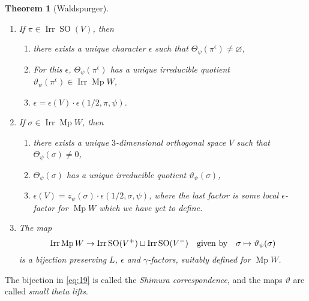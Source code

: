 \documentclass[11pt,a4paper,leqno]{article}
\newcommand{\1}{\mathbbm{1}}
\renewcommand{\emptyset}{\varnothing}
\DeclareMathOperator{\Irr}{Irr}
\DeclareMathOperator{\Mp}{Mp}
\DeclareMathOperator{\SO}{SO}
\theoremstyle{plain}
\newtheorem{theorem}{Theorem}[section]
\theoremstyle{definition}
\theoremstyle{remark}
\numberwithin{equation}{section}
\begin{document}
\begin{theorem}[Waldspurger]\mbox{\ }
  \begin{enumerate}
  \item If $\pi \in \Irr \SO(V)$, then
    \begin{enumerate}
    \item there exists a unique character $\epsilon$ such that $\Theta_{\psi}(\pi^{\epsilon})
      \ne \emptyset$,
    \item For this $\epsilon$, $\Theta_{\psi}(\pi^{\epsilon})$ has a unique irreducible
      quotient $\vartheta_{\psi}(\pi^{\epsilon}) \in \Irr \Mp W$,
    \item $\epsilon = \epsilon(V) \cdot \epsilon(1/2,\pi,\psi)$.
    \end{enumerate}
  \item If $\sigma \in \Irr \Mp W$, then 
    \begin{enumerate}
    \item there exists a unique $3$-dimensional orthogonal space $V$
      such that $\Theta_{\psi}(\sigma) \ne 0$, 
    \item $\Theta_{\psi}(\sigma)$ has a unique irreducible quotient $\vartheta_{\psi}(\sigma)$,
    \item $\epsilon(V) = z_{\psi}(\sigma) \cdot \epsilon(1/2,\sigma,\psi)$, where the last factor is
      some local $\epsilon$-factor for $\Mp W$ which we have yet to define.
    \end{enumerate}
  \item The map
    \begin{equation}
      \label{eq:19}
\Irr \Mp W \to \Irr \SO(V^{+}) \sqcup \Irr \SO(V^{-}) \qq{given by} \sigma \mapsto \vartheta_{\psi}(\sigma)
    \end{equation}
is a bijection preserving $L$, $\epsilon$ and $\gamma$-factors, suitably defined
for $\Mp W$.
  \end{enumerate}
\end{theorem}
The bijection in \cref{eq:19} is called the \textit{Shimura
  correspondence}, and the maps $\vartheta$ are called \emph{small
  theta lifts}.
\end{document}
